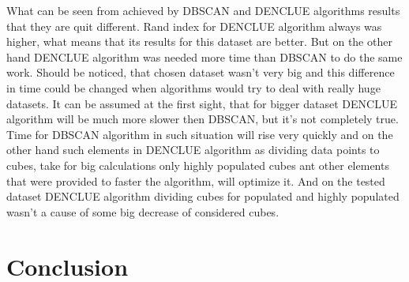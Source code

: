 \documentclass[12pt, a4paper, notitlepage, oneside]{article}
\begin{document}
What can be seen from achieved by DBSCAN and DENCLUE algorithms results that they are quit different. Rand index for DENCLUE algorithm always was higher, what means that its results for this dataset are better. But on the other hand DENCLUE  algorithm was needed  more time than DBSCAN to do the same work. Should be noticed, that chosen dataset wasn't very big and this difference in time could be changed when algorithms would try to deal with really huge datasets. It can be assumed at the first sight, that for bigger dataset DENCLUE algorithm will be much more slower then DBSCAN, but it's not completely true. Time for DBSCAN algorithm in such situation will rise very quickly and on the other hand such elements in DENCLUE algorithm as dividing data points to cubes, take for big calculations only highly populated cubes ant other elements that were provided to faster the algorithm, will optimize it. And on the tested dataset DENCLUE algorithm dividing cubes for populated and highly populated wasn't a cause of some big decrease of considered cubes. 


\cleardoublepage


\section*{Conclusion}





\newpage



\end{document}
